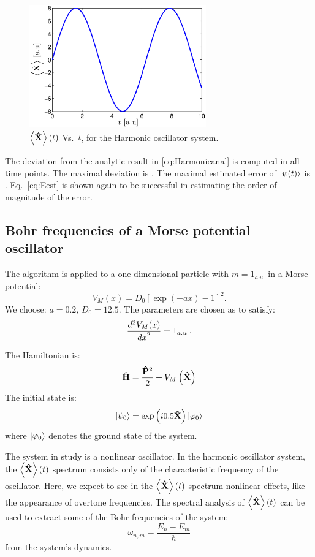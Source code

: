 \documentclass[12pt, a4paper]{article}
\begin{document}
\begin{figure}[htb]
	\centering\includegraphics[width=3in]{harmonicmx}
	\caption{$\left<\mathbf{\hat X} \right>(t)$ Vs.\ $t$, for the Harmonic oscillator system.}\label{fig:Harmonic}
\end{figure}

The deviation from the analytic result in \eqref{eq:Harmonicanal} is computed in all time points. The maximal deviation is . The maximal estimated error of $\left|\psi(t)\right>$ is . Eq.~\eqref{eq:Eest} is shown again to be successful in estimating the order of magnitude of the error.

\subsection{Bohr frequencies of a Morse potential oscillator}
The algorithm is applied to a one-dimensional particle with $m=1_{a.u.}$ in a Morse potential:
\begin{equation}\label{eq:Morse}
	V_{M}(x) = D_0[\exp(-a x) - 1]^2.
\end{equation}
We choose: $a=0.2$, $D_0 = 12.5$. The parameters are chosen as to satisfy:
\[
	\frac{d^2V_{M}(x)}{{dx}^2} = 1_{a.u.}.
\]
 
The Hamiltonian is:
\begin{equation}
	\mathbf{\hat H} = \frac{\mathbf{\hat P}^2}{2} + V_{M}\left(\mathbf{\hat X}\right)
\end{equation}
The initial state is:
\begin{equation}\label{eq:psi0Morse}
	\left|\psi_0\right> = \exp\left(i 0.5 \mathbf{\hat X}\right)\left|\varphi_0\right>
\end{equation}
where $\left|\varphi_0\right>$ denotes the ground state of the system.

The system in study is a nonlinear oscillator. In the harmonic oscillator system, the $\left<\mathbf{\hat X} \right>(t)$ spectrum consists only of the characteristic frequency of the oscillator. Here, we expect to see in the $\left<\mathbf{\hat X} \right>(t)$ spectrum nonlinear effects, like the appearance of overtone frequencies. The spectral analysis of $\left<\mathbf{\hat X} \right>(t)$ can be used to extract some of the Bohr frequencies of the system:
\[
	\omega_{n,m} = \frac{E_n - E_m}{\hbar}
\]
from the system's dynamics.
\end{document}
